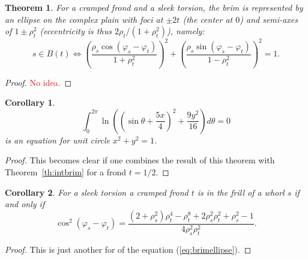\documentclass{article}
\newcommand{\be}{\begin{equation}}
\newcommand{\ee}{\end{equation}}
\newcommand{\red}[1]{\textcolor{red}{#1}}
\theoremstyle{plain}
\newtheorem{theorem}{Theorem}[section]
\newtheorem{corollary}{Corollary}[theorem]
\theoremstyle{definition}
\begin{document}
    \begin{theorem}
        For a cramped frond and a sleek torsion, the brim is represented by an ellipse on the complex plain with foci at $\pm 2t$ (the center at $0$) and semi-axes of $1\pm\rho_t^2$ (eccentricity is thus $2\rho_t/(1+\rho_t^2)$), namely:
        \be\label{eq:brimellipse}
            s \in B(t) \Leftrightarrow \left(\frac{\rho_s\cos(\varphi_s-\varphi_t)}{1+\rho_t^2}\right)^2 + \left(\frac{\rho_s\sin(\varphi_s-\varphi_t)}{1-\rho_t^2}\right)^2 = 1 
        .\ee
    \end{theorem}
    \begin{proof}
        \red{No idea.}
    \end{proof}

    \begin{corollary}
        $$
            \int_0^{2\pi} \ln\left(\left(\sin\theta+\frac{5x}4\right)^2+\frac{9y^2}{16}\right)d\theta = 0  
        $$ is an equation for unit circle $x^2+y^2=1$.

    \end{corollary}

    \begin{proof}
        This becomes clear if one combines the result of this theorem with Theorem~\ref{th:intbrim} for a frond $t=1/2$.  
    \end{proof}
    \begin{corollary}
        For a sleek torsion a cramped frond $t$ is in the frill of a whorl $s$ if and only if 
        $$
            \cos^2(\varphi_s-\varphi_t) = \frac{(2 + \rho_s^2)\rho_t^4 - \rho_t^8 + 2\rho_s^2\rho_t^2 + \rho_s^2 - 1}{4\rho_s^2\rho_t^2}
        .$$
    \end{corollary}

    \begin{proof}
        This is just another for of the equation (\ref{eq:brimellipse}).  
    \end{proof}
\end{document}
